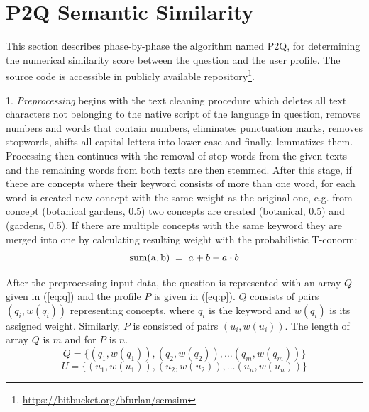 \documentclass[conference]{IEEEtran}
\begin{document}
\section{P2Q Semantic Similarity}
\label{sec:alg}
This section describes phase-by-phase the algorithm named P2Q, for determining the numerical similarity score between the question and the user profile. The source code is accessible in publicly available repository\footnote{\url{https://bitbucket.org/bfurlan/semsim}}.
	
1. {\it Preprocessing} begins with the text cleaning procedure which deletes all text characters not belonging to the native script of the language in question, removes numbers and words that contain numbers, eliminates punctuation marks, removes stopwords, shifts all capital letters into lower case and finally, lemmatizes them. Processing then continues with the removal of stop words from the given texts and the remaining words from both texts are then stemmed. After this stage, if there are concepts where their keyword consists of more than one word, for each word is created new concept with the same weight as the original one, e.g. from concept (botanical gardens, 0.5) two concepts are created (botanical, 0.5) and (gardens, 0.5). If there are multiple concepts with the same keyword they are merged into one by calculating resulting weight with the probabilistic T-conorm: 
\vspace{-0.1cm}
\begin{equation}
	\label{eq:tconorm}
	{\rm sum(a,b)}\;=\;a+b-a\cdot b
\end{equation}

\vspace{-0.3cm}
After the preprocessing input data, the question is represented with an array $Q$ given in (\ref{eq:q}) and the profile $P$ is given in (\ref{eq:p}). $Q$ consists of pairs $(q_i,w(q_i))$ representing concepts, where $q_i$ is the keyword and $w(q_i)$ is its assigned weight. Similarly, $P$ is consisted of pairs $(u_i,w(u_i))$. The length of array $Q$ is $m$ and for $P$ is $n$.
\vspace{-0.2cm}
\begin{equation}
	\label{eq:q}
	Q = \{(q_1,w(q_1)),(q_2,w(q_2)),\ldots(q_m,w(q_m))\}
\end{equation} 
\begin{equation}
	\label{eq:p}
	U=\{(u_1,w(u_1)),(u_2,w(u_2)),\ldots(u_n,w(u_n))\}
\end{equation}
\end{document}
